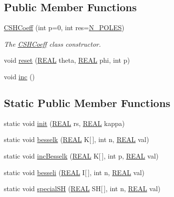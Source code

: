 \subsection*{Public Member Functions}
\begin{DoxyCompactItemize}
\item 
\hyperlink{classCSHCoeff_a286a374e16fd7741f869fe5edb1ef9d4}{C\-S\-H\-Coeff} (int p=0, int res=\hyperlink{mcoeff_8h_ac23f9c13c5d07d9ce386f7a830c35e5a}{N\-\_\-\-P\-O\-L\-E\-S})
\begin{DoxyCompactList}\small\item\em The \hyperlink{classCSHCoeff}{C\-S\-H\-Coeff} class constructor. \end{DoxyCompactList}\item 
void \hyperlink{classCSHCoeff_a7aa1d16fe8a3e18012f2ccaec89a0a0f}{reset} (\hyperlink{util_8h_a5821460e95a0800cf9f24c38915cbbde}{R\-E\-A\-L} theta, \hyperlink{util_8h_a5821460e95a0800cf9f24c38915cbbde}{R\-E\-A\-L} phi, int p)
\item 
void \hyperlink{classCSHCoeff_adf80cf8370b4db9957de7acfe8aa64d6}{inc} ()
\end{DoxyCompactItemize}
\subsection*{Static Public Member Functions}
\begin{DoxyCompactItemize}
\item 
static void \hyperlink{classCSHCoeff_ae6ad53fe9a4862de25fe7f2788649a41}{init} (\hyperlink{util_8h_a5821460e95a0800cf9f24c38915cbbde}{R\-E\-A\-L} rs, \hyperlink{util_8h_a5821460e95a0800cf9f24c38915cbbde}{R\-E\-A\-L} kappa)
\item 
static void \hyperlink{classCSHCoeff_acd63e5bb85843c08800a83281f3daad9}{besselk} (\hyperlink{util_8h_a5821460e95a0800cf9f24c38915cbbde}{R\-E\-A\-L} K\mbox{[}$\,$\mbox{]}, int n, \hyperlink{util_8h_a5821460e95a0800cf9f24c38915cbbde}{R\-E\-A\-L} val)
\item 
static void \hyperlink{classCSHCoeff_a8fd12308d0884731596cc1268b04d232}{inc\-Besselk} (\hyperlink{util_8h_a5821460e95a0800cf9f24c38915cbbde}{R\-E\-A\-L} K\mbox{[}$\,$\mbox{]}, int p, \hyperlink{util_8h_a5821460e95a0800cf9f24c38915cbbde}{R\-E\-A\-L} val)
\item 
static void \hyperlink{classCSHCoeff_aa6cc07501f3b8ab8d2f9f32ba5a7b279}{besseli} (\hyperlink{util_8h_a5821460e95a0800cf9f24c38915cbbde}{R\-E\-A\-L} I\mbox{[}$\,$\mbox{]}, int n, \hyperlink{util_8h_a5821460e95a0800cf9f24c38915cbbde}{R\-E\-A\-L} val)
\item 
static void \hyperlink{classCSHCoeff_ac30535573d45c2da6a424c415967e6f2}{special\-S\-H} (\hyperlink{util_8h_a5821460e95a0800cf9f24c38915cbbde}{R\-E\-A\-L} S\-H\mbox{[}$\,$\mbox{]}, int n, \hyperlink{util_8h_a5821460e95a0800cf9f24c38915cbbde}{R\-E\-A\-L} val)
\end{DoxyCompactItemize}
